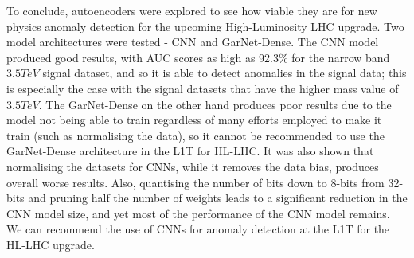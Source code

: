 \documentclass[a4paper]{article}
\theoremstyle{plain}
\theoremstyle{definition}
\begin{document}
	 To conclude, autoencoders were explored to see how viable they are for new physics anomaly detection for the upcoming High-Luminosity LHC upgrade. Two model architectures were tested - CNN and GarNet-Dense. The CNN model produced good results, with AUC scores as high as 92.3\% for the narrow band $3.5 TeV$ signal dataset, and so it is able to detect anomalies in the signal data; this is especially the case with the signal datasets that have the higher mass value of $3.5 TeV$. The GarNet-Dense on the other hand produces poor results due to the model not being able to train regardless of many efforts employed to make it train (such as normalising the data), so it cannot be recommended to use the GarNet-Dense architecture in the L1T for HL-LHC. It was also shown that normalising the datasets for CNNs, while it removes the data bias, produces overall worse results. Also, quantising the number of bits down to 8-bits from 32-bits and pruning half the number of weights leads to a significant reduction in the CNN model size, and yet most of the performance of the CNN model remains. We can recommend the use of CNNs for anomaly detection at the L1T for the HL-LHC upgrade.
	
	\newpage
	
	
	\appendix
	
\end{document}

